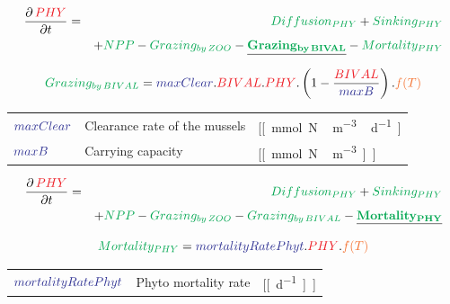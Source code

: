 \documentclass[final,xcolor=dvipsnames]{beamer}
\begin{document}
            \begin{frame}
	\begin{exampleblock}{}
	  \begin{eqnarray*}
	    \small
	    \frac{\partial\,\varC[PHY]}{\partial t} & = & \proC[Diffusion_{PHY}] + \proC[Sinking_{PHY}] \\
	    & & + \proC[NPP] -\proC[Grazing_{by\,ZOO}] -  \underline{\mathbf{\proC[Grazing_{by\,BIVAL}]}} - \proC[Mortality_{PHY}]
	  \end{eqnarray*}
	\end{exampleblock}
	\begin{exampleblock}{}
	  \begin{equation*}
	    \proC[Grazing_{by\,BIVAL}] = \parC[maxClear] .\varC[BIVAL].\varC[PHY]. \left( 1- \frac{\varC[BIVAL]}{\parC[maxB]}\right) .\worC[f(T)]
	  \end{equation*}
	    \begin{tabular}{ l l l}
	      $\parC[maxClear]$   &   Clearance rate of the mussels  &   [\unit[mmol N\,m^{-3}\,d^{-1}] \\
	      $\parC[maxB]$       &   Carrying capacity  &  [\unit[mmol N\,m^{-3}]]
	    \end{tabular}
	    	\end{exampleblock}
      \end{frame}
      
       \begin{frame}
	\begin{exampleblock}{}
	  \begin{eqnarray*}
	    \small
	    \frac{\partial\,\varC[PHY]}{\partial t} & = & \proC[Diffusion_{PHY}] + \proC[Sinking_{PHY}] \\
	    & & + \proC[NPP] -\proC[Grazing_{by\,ZOO}] -  \proC[Grazing_{by\,BIVAL}] - \underline{\mathbf{\proC[Mortality_{PHY}]}}
	  \end{eqnarray*}
	\end{exampleblock}
	\begin{exampleblock}{}
	  \begin{equation*}
	    \proC[Mortality_{PHY}] =  \parC[mortalityRatePhyt] . \varC[PHY] .\worC[f(T)]
	  \end{equation*}
	    \begin{tabular}{ l l l}
	      $\parC[mortalityRatePhyt]$   &   Phyto mortality rate  &   [\unit[d^{-1}]]  
	    \end{tabular}
	    \end{exampleblock}
      \end{frame}
      
\end{document}
